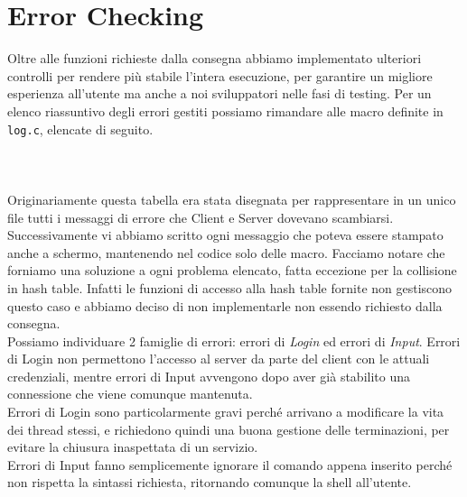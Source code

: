 \documentclass[a4paper, 11pt]{article} %
\begin{document}
\section*{Error Checking}
Oltre alle funzioni richieste dalla consegna abbiamo implementato ulteriori controlli per rendere più stabile l'intera esecuzione, per garantire un migliore esperienza all'utente ma anche a noi sviluppatori nelle fasi di testing. Per un elenco riassuntivo degli errori gestiti possiamo rimandare alle macro definite in \texttt{log.c}, elencate di seguito.\\\\\\\\ 
Originariamente questa tabella era stata disegnata per rappresentare in un unico file tutti i messaggi di errore che Client e Server dovevano scambiarsi. Successivamente vi abbiamo scritto ogni messaggio che poteva essere stampato anche a schermo, mantenendo nel codice solo delle macro. Facciamo notare che forniamo una soluzione a ogni problema elencato, fatta eccezione per la collisione in hash table. Infatti le funzioni di accesso alla hash table fornite non gestiscono questo caso e abbiamo deciso di non implementarle non essendo richiesto dalla consegna.\\
Possiamo individuare 2 famiglie di errori: errori di \textit{Login} ed errori di \textit{Input}. Errori di Login non permettono l'accesso al server da parte del client con le attuali credenziali, mentre errori di Input avvengono dopo aver già stabilito una connessione che viene comunque mantenuta.\\
Errori di Login sono particolarmente gravi perché arrivano a modificare la vita dei thread stessi, e richiedono quindi una buona gestione delle terminazioni, per evitare la chiusura inaspettata di un servizio.\\
Errori di Input fanno semplicemente ignorare il comando appena inserito perché non rispetta la sintassi richiesta, ritornando comunque la shell all'utente.\\
\end{document}
